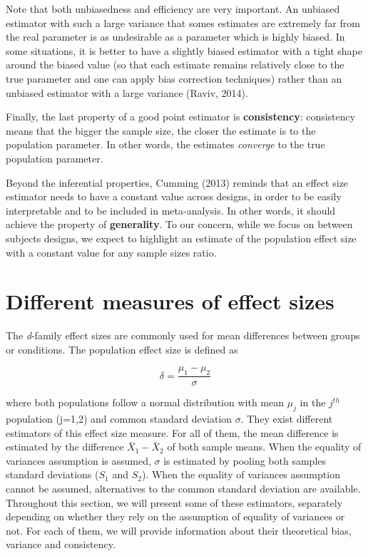 \documentclass[
  man,floatsintext]{apa6}
\begin{document}
Note that both unbiasedness and efficiency are very important. An unbiased estimator with such a large variance that somes estimates are extremely far from the real parameter is as undesirable as a parameter which is highly biased. In some situations, it is better to have a slightly biased estimator with a tight shape around the biased value (so that each estimate remains relatively close to the true parameter and one can apply bias correction techniques) rather than an unbiased estimator with a large variance (Raviv, 2014).

Finally, the last property of a good point estimator is \textbf{consistency}: consistency means that the bigger the sample size, the closer the estimate is to the population parameter. In other words, the estimates \emph{converge} to the true population parameter.

Beyond the inferential properties, Cumming (2013) reminds that an effect size estimator needs to have a constant value across designs, in order to be easily interpretable and to be included in meta-analysis. In other words, it should achieve the property of \textbf{generality}. To our concern, while we focus on between subjects designs, we expect to highlight an estimate of the population effect size with a constant value for any sample sizes ratio.

\hypertarget{different-measures-of-effect-sizes}{%
\section{Different measures of effect sizes}\label{different-measures-of-effect-sizes}}

The \emph{d}-family effect sizes are commonly used for mean differences between groups or conditions. The population effect size is defined as

\begin{equation} 
\delta = \frac{\mu_{1}-\mu_{2}}{\sigma} 
\label{eq:Cohendelta}
\end{equation}

where both populations follow a normal distribution with mean \(\mu_j\) in the \(j^{th}\) population (j=1,2) and common standard deviation \(\sigma\). They exist different estimators of this effect size measure. For all of them, the mean difference is estimated by the difference \(\bar{X}_1-\bar{X}_2\) of both sample means. When the equality of variances assumption is assumed, \(\sigma\) is estimated by pooling both samples standard deviations (\(S_1\) and \(S_2\)). When the equality of variances assumption cannot be assumed, alternatives to the common standard deviation are available. Throughout this section, we will present some of these estimators, separately depending on whether they rely on the assumption of equality of variances or not. For each of them, we will provide information about their theoretical bias, variance and consistency.
\end{document}

